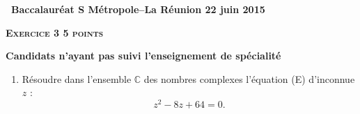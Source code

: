 \documentclass[10pt]{article}
\newcommand{\C}{\mathbb{C}}
\begin{document}
\setlength\parindent{0mm}
\renewcommand \footrulewidth{.2pt}
\pagestyle{fancy}
\thispagestyle{empty}
\begin{center} {\Large{\textbf{\decofourleft~Baccalauréat S Métropole--La Réunion 22 juin 2015~\decofourright
}}} 

\end{center}

\vspace{0,5cm}

\vspace{0,5cm}

\textbf{\textsc{Exercice 3 \hfill 5 points}}

\textbf{Candidats n'ayant pas suivi l'enseignement de spécialité} 

\medskip

\begin{enumerate}
 \item  Résoudre dans l'ensemble $\C$ des nombres complexes l'équation (E) d'inconnue $z$ :
\[z^2 - 8z + 64 = 0.\]
 
\end{enumerate}
\end{document}
